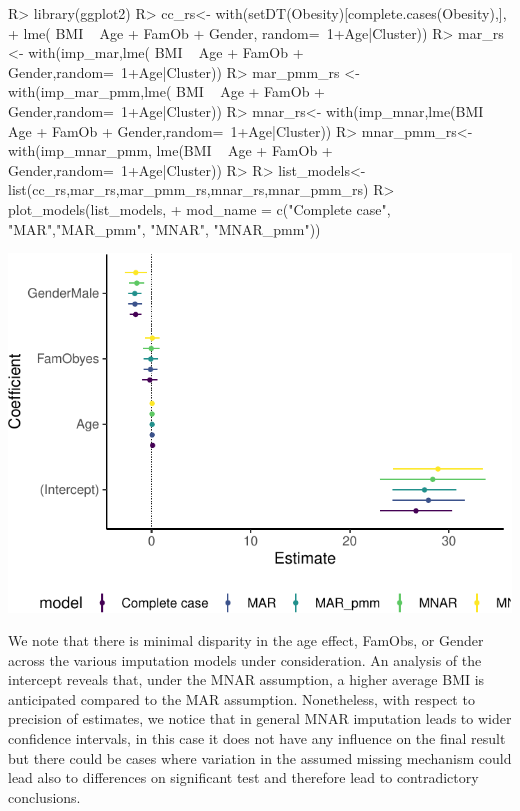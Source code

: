 \documentclass[
]{jss}
\begin{document}
\begin{CodeChunk}
\begin{CodeInput}
R> library(ggplot2)
R> cc_rs<- with(setDT(Obesity)[complete.cases(Obesity),],
+              lme( BMI ~ Age + FamOb + Gender, random=~1+Age|Cluster))
R> mar_rs <- with(imp_mar,lme( BMI ~ Age + FamOb + Gender,random=~1+Age|Cluster))
R> mar_pmm_rs <- with(imp_mar_pmm,lme( BMI ~ Age + FamOb + Gender,random=~1+Age|Cluster))
R> mnar_rs<- with(imp_mnar,lme(BMI ~ Age + FamOb + Gender,random=~1+Age|Cluster))
R> mnar_pmm_rs<- with(imp_mnar_pmm, lme(BMI ~ Age + FamOb + Gender,random=~1+Age|Cluster))
R> 
R> list_models<-list(cc_rs,mar_rs,mar_pmm_rs,mnar_rs,mnar_pmm_rs)
R> plot_models(list_models,
+             mod_name = c("Complete case", "MAR","MAR_pmm", "MNAR", "MNAR_pmm"))
\end{CodeInput}


\begin{center}\includegraphics{Imputation_of_Incomplete_Multilevel_Data_files/figure-latex/models-1} \end{center}

\end{CodeChunk}

We note that there is minimal disparity in the age effect, FamObs, or
Gender across the various imputation models under consideration. An
analysis of the intercept reveals that, under the MNAR assumption, a
higher average BMI is anticipated compared to the MAR assumption.
Nonetheless, with respect to precision of estimates, we notice that in
general MNAR imputation leads to wider confidence intervals, in this
case it does not have any influence on the final result but there could
be cases where variation in the assumed missing mechanism could lead
also to differences on significant test and therefore lead to
contradictory conclusions.
\end{document}
